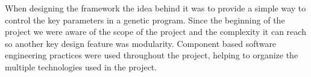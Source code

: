 When designing the framework the idea behind it was to provide a simple way to control the key parameters in a genetic program.
Since the beginning of the project we were aware of the scope of the project and the complexity it can reach so another key
design feature was modularity. Component based software engineering practices were used throughout the project,
helping to organize the multiple technologies used in the project.